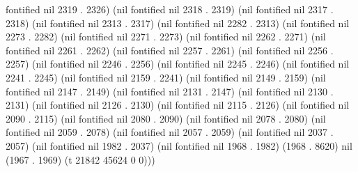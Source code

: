 fontified nil 2319 . 2326) (nil fontified nil 2318 . 2319) (nil fontified nil 2317 . 2318) (nil fontified nil 2313 . 2317) (nil fontified nil 2282 . 2313) (nil fontified nil 2273 . 2282) (nil fontified nil 2271 . 2273) (nil fontified nil 2262 . 2271) (nil fontified nil 2261 . 2262) (nil fontified nil 2257 . 2261) (nil fontified nil 2256 . 2257) (nil fontified nil 2246 . 2256) (nil fontified nil 2245 . 2246) (nil fontified nil 2241 . 2245) (nil fontified nil 2159 . 2241) (nil fontified nil 2149 . 2159) (nil fontified nil 2147 . 2149) (nil fontified nil 2131 . 2147) (nil fontified nil 2130 . 2131) (nil fontified nil 2126 . 2130) (nil fontified nil 2115 . 2126) (nil fontified nil 2090 . 2115) (nil fontified nil 2080 . 2090) (nil fontified nil 2078 . 2080) (nil fontified nil 2059 . 2078) (nil fontified nil 2057 . 2059) (nil fontified nil 2037 . 2057) (nil fontified nil 1982 . 2037) (nil fontified nil 1968 . 1982) (1968 . 8620) nil (1967 . 1969) (t 21842 45624 0 0)))
